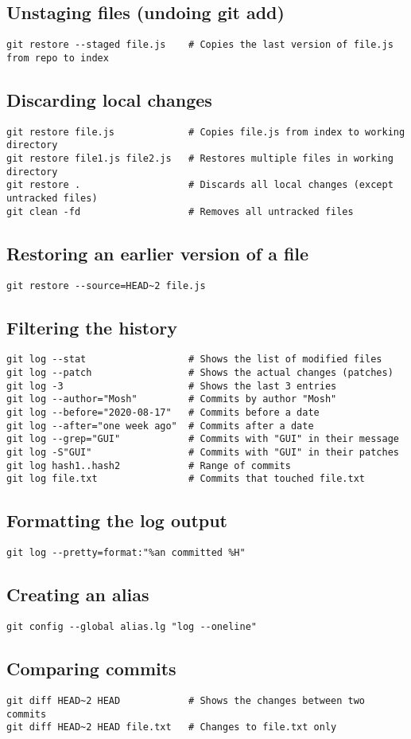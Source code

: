 \documentclass[a4paper,10pt]{article}
\newcommand{\subsectiontitle}[1]{\subsection*{#1}\vspace{-0.3em}}
\begin{document}
\subsectiontitle{Unstaging files (undoing git add)}
\begin{verbatim}
git restore --staged file.js    # Copies the last version of file.js from repo to index
\end{verbatim}

\subsectiontitle{Discarding local changes}
\begin{verbatim}
git restore file.js             # Copies file.js from index to working directory
git restore file1.js file2.js   # Restores multiple files in working directory
git restore .                   # Discards all local changes (except untracked files)
git clean -fd                   # Removes all untracked files
\end{verbatim}

\subsectiontitle{Restoring an earlier version of a file}
\begin{verbatim}
git restore --source=HEAD~2 file.js
\end{verbatim}

\subsectiontitle{Filtering the history}
\begin{verbatim}
git log --stat                  # Shows the list of modified files
git log --patch                 # Shows the actual changes (patches)
git log -3                      # Shows the last 3 entries
git log --author="Mosh"         # Commits by author "Mosh"
git log --before="2020-08-17"   # Commits before a date
git log --after="one week ago"  # Commits after a date
git log --grep="GUI"            # Commits with "GUI" in their message
git log -S"GUI"                 # Commits with "GUI" in their patches
git log hash1..hash2            # Range of commits
git log file.txt                # Commits that touched file.txt
\end{verbatim}

\subsectiontitle{Formatting the log output}
\begin{verbatim}
git log --pretty=format:"%an committed %H"
\end{verbatim}

\subsectiontitle{Creating an alias}
\begin{verbatim}
git config --global alias.lg "log --oneline"
\end{verbatim}

\subsectiontitle{Comparing commits}
\begin{verbatim}
git diff HEAD~2 HEAD            # Shows the changes between two commits
git diff HEAD~2 HEAD file.txt   # Changes to file.txt only
\end{verbatim}
\end{document}
